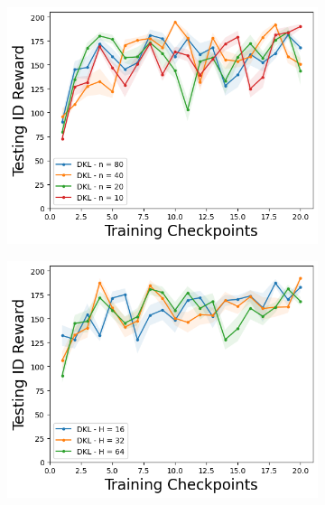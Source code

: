 \begin{figure}
\centering
    \begin{subfigure}{.24\textwidth}
        \includegraphics[width=\textwidth]{sections/011_icml2022/resources/CartPole-v0-mean_reward_-testing-hyperparameter-n_inducing_points-dkl.png}  
    \end{subfigure}
        \begin{subfigure}{.24\textwidth}
        \includegraphics[width=\textwidth]{sections/011_icml2022/resources/CartPole-v0-mean_reward_-testing-hyperparameter-latent_dim-dkl.png}  
    \end{subfigure}
        \begin{subfigure}{.24\textwidth}

\end{subfigure}
\end{figure}
